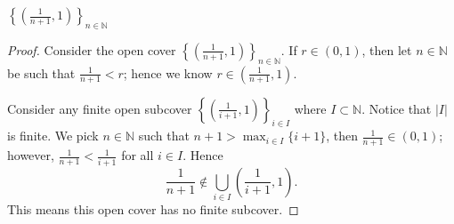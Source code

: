 \begin{Exercise}
\begin{answer}
$\left\{ \left(\frac{1}{n+1},1\right) \right\}_{n\in\mathbb{N}}$
\end{answer}
\begin{proof}
Consider the open cover $\left\{ \left(\frac{1}{n+1},1\right) \right\}_{n\in\mathbb{N}}$. If $r\in(0,1)$, then let $n\in\mathbb{N}$ be such that $\frac{1}{n+1}<r$; hence we know $r\in\left( \frac{1}{n+1},1 \right)$.

Consider any finite open subcover $\left\{ \left(\frac{1}{i+1},1\right) \right\}_{i\in I}$ where $I\subset \mathbb{N}$. Notice that $|I|$ is finite. We pick $n\in\mathbb{N}$ such that $n+1>\max_{i\in I}\{i+1\}$, then $\frac{1}{n+1}\in(0,1)$; however, $\frac{1}{n+1} < \frac{1}{i+1}$ for all $i\in I$. Hence
$$
\frac{1}{n+1} \notin \bigcup_{i\in I}\left(\frac{1}{i+1},1\right).
$$
This means this open cover has no finite subcover.
\end{proof}
\end{Exercise}
